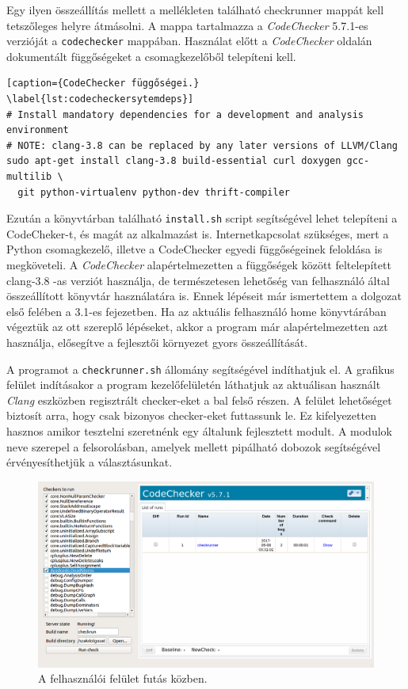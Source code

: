 \documentclass[a4paper,12pt]{report}
\begin{document}
Egy ilyen összeállítás mellett a mellékleten található checkrunner mappát kell tetszőleges helyre átmásolni. A mappa tartalmazza a \emph{CodeChecker} 5.7.1-es verzióját a \texttt{codechecker} mappában. Használat előtt a \emph{CodeChecker} oldalán dokumentált függőségeket a csomagkezelőből telepíteni kell.

\begin{lstlisting}[caption={CodeChecker függőségei.}
\label{lst:codecheckersytemdeps}]
# Install mandatory dependencies for a development and analysis environment
# NOTE: clang-3.8 can be replaced by any later versions of LLVM/Clang
sudo apt-get install clang-3.8 build-essential curl doxygen gcc-multilib \
  git python-virtualenv python-dev thrift-compiler
\end{lstlisting}

Ezután a könyvtárban található \texttt{install.sh} script segítségével lehet telepíteni a CodeCheker-t, és magát az alkalmazást is. Internetkapcsolat szükséges, mert a Python csomagkezelő, illetve a CodeChecker egyedi függőségeinek feloldása is megköveteli. A \emph{CodeChecker} alapértelmezetten a függőségek között feltelepített clang-3.8 -as verziót használja, de természetesen lehetőség van felhasználó által összeállított könyvtár használatára is. Ennek lépéseit már ismertettem a dolgozat első felében a 3.1-es fejezetben. Ha az aktuális felhasználó home könyvtárában végeztük az ott szereplő lépéseket, akkor a program már alapértelmezetten azt használja, elősegítve a fejlesztői környezet gyors összeállítását.

A programot a \texttt{checkrunner.sh} állomány segítségével indíthatjuk el. A grafikus felület indításakor a program kezelőfelületén láthatjuk az aktuálisan használt \emph{Clang} eszközben regisztrált checker-eket a bal felső részen. A felület lehetőséget biztosít arra, hogy csak bizonyos checker-eket futtassunk le. Ez kifelyezetten hasznos amikor tesztelni szeretnénk egy általunk fejlesztett modult. A modulok neve szerepel a felsorolásban, amelyek mellett pipálható dobozok segítségével érvényesíthetjük a választásunkat.


\begin{figure}[h]
\caption{A felhasználói felület futás közben.}
\centering
\includegraphics[scale=0.36]{ui.png}
\end{figure}
\end{document}
